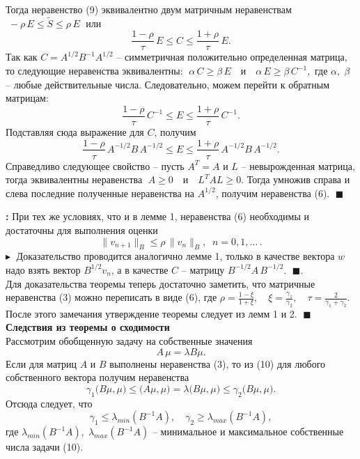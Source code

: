Тогда неравенство (9) эквивалентно двум матричным неравенствам  $\;-\rho\,E \leq \widetilde{S} \leq \rho \,E
\;$ или 
$$
\frac{1-\rho}{\tau}\, E \leq C\leq \frac{1+\rho}{\tau}\,E.
$$
Так как $ C = A^{1/2}B^{-1}A^{1/2}$ -- симметричная положительно определенная матрица, то следующие неравенства эквивалентны: $\;
\alpha\, C \geq \beta\, E \quad \textit{и} \quad \alpha \, E \geq \beta \, C^{-1},$ 
где $\alpha, \; \beta$ -- любые действительные числа. Следовательно, можем перейти к обратным матрицам:
$$
\frac{1-\rho}{\tau}\, C^{-1} \leq E\leq \frac{1+\rho}{\tau}\,C^{-1}.
$$
Подставляя сюда выражение для $C$, получим
$$
\frac{1-\rho}{\tau}\, A^{-1/2}B\,A^{-1/2} \leq E\leq \frac{1+\rho}{\tau}\, A^{-1/2}B\,A^{-1/2}.
$$
Справедливо следующее свойство -- пусть $ A^T = A$ и $L$ -- невырожденная матрица, тогда эквивалентны неравенства 
$
\;A \geq 0\quad \textit{и} \quad L^T A L \geq 0.$ Тогда умножив справа и слева последние полученные неравенства на $A^{
1/2}$, получим неравенства (6). $\;\blacksquare$

\textbf{:\;} При тех же условиях, что и в лемме 1, неравенства (6) необходимы и достаточны для выполнения оценки 
$$
\|v_{n+1}\|_B \leq \rho\,\|v_n\|_B,\;\; n = 0, 1, \ldots \,.
$$
$\blacktriangleright\;$ Доказательство проводится аналогично лемме 1, только в качестве вектора $w$ надо взять вектор $B^{1/2} v_n$, а в качестве $C$ -- матрицу $B^{-1/2} A\, B^{-1/2}$. $\;\blacksquare$.\\

Для доказательства теоремы теперь достаточно заметить, что матричные неравенства (3) можно переписать в виде (6), где $
\rho = \frac{1 - \xi}{1+\xi}, \quad \xi = \frac{\gamma_1}{\gamma_2}, \quad \tau=\frac{2}{\gamma_1 + \gamma_2}.
$
После этого замечания утверждение теоремы  следует из лемм 1 и 2. $\;\blacksquare$\\

\textbf{Следствия из теоремы о сходимости}\\
Рассмотрим обобщенную задачу на собственные значения 
\begin{equation}
    \tag{10}
    A\, \mu = \lambda B \mu. 
\end{equation}
Если для матриц $A$ и $B$ выполнены неравенства (3), то из (10) для любого собственного вектора получим неравенства 
$$
\gamma_1 \big(B \mu, \mu) \leq \big( A \mu, \mu \big) = \lambda \big(B \mu, \mu\big) \leq \gamma_2 \big(B \mu, \mu\big).$$
Отсюда следует, что 
\begin{equation}
    \tag{11}
    \gamma_1 \leq \lambda_{min}(B^{-1}A), \quad \gamma_2 \geq \lambda_{max}(B^{-1}A),
\end{equation}
где $\lambda_{min}(B^{-1}A), \;  \lambda_{max}(B^{-1}A) $ -- минимальное и максимальное собственные числа задачи (10).


